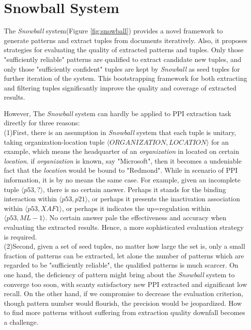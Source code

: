 \section{Snowball System}

The \emph{Snowball} system\cite{Agichtein.Gravano:2000}(Figure \ref{fig:snowball}) provides a novel framework to generate patterns and extract tuples from documents iteratively. Also, it proposes strategies for evaluating the quality of extracted patterns and tuples. Only those "sufficiently reliable" patterns are qualified to extract candidate new tuples, and only those "sufficiently confident" tuples are kept by \emph{Snowball} as seed tuples for further iteration of the system. This bootstrapping framework for both extracting and filtering tuples significantly improve the quality and coverage of extracted results.

However, The \emph{Snowball} system can hardly be applied to PPI extraction task directly for three reasons:\\

(1)First, there is an assumption in \emph{Snowball} system that each tuple is unitary, taking organization-location tuple $\langle ORGANIZATION,LOCATION\rangle$ for an example, which means the headquarter of an \emph{organization} in located on certain \emph{location}. if \emph{organization} is known, say "Microsoft", then it becomes a undeniable fact that the \emph{location} would be bound to "Redmond". While in scenario of PPI information, it is by no means the same case. For example, given an incomplete tuple $\langle p53,?\rangle$, there is no certain answer. Perhaps it stands for the binding interaction within $\langle p53,p21\rangle$, or perhaps it presents the inactivation association within $\langle p53,XAF1\rangle$, or perhaps it indicates the up=regulation within $\langle p53,ML-1\rangle$. No certain answer pale the effectiveness and accuracy when evaluating the extracted results. Hence, a more sophisticated evaluation strategy is required.\\

(2)Second, given a set of seed tuples, no matter how large the set is, only a small fraction of patterns can be extracted, let alone the number of patterns which are regarded to be "sufficiently reliable", the qualified patterns is much scarcer. On one hand, the deficiency of pattern might bring about the \emph{Snowball} system to converge too soon, with scanty satisfactory new PPI extracted and significant low recall. On the other hand, if we compromise to decrease the evaluation criterion, though pattern number would flourish, the precision would be jeopardized. How to find more patterns without suffering from extraction quality downfall becomes a challenge.\\

